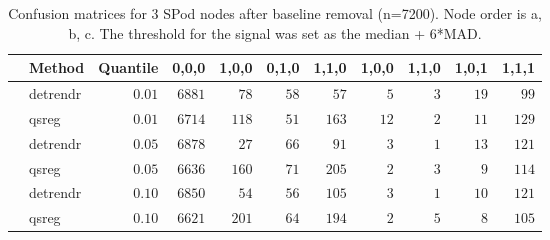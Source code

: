 \begin{table}[!tbp]
\caption{Confusion matrices for 3 SPod nodes after baseline 
      removal (n=7200). Node order is a, b, c. The threshold for the signal was 
      set as the median + 6*MAD.\label{confusion}} 
\begin{center}
\begin{tabular}{llrrrrrrrrr}
\hline\hline
\multicolumn{1}{l}{}&\multicolumn{1}{c}{Method}&\multicolumn{1}{c}{Quantile}&\multicolumn{1}{c}{0,0,0}&\multicolumn{1}{c}{1,0,0}&\multicolumn{1}{c}{0,1,0}&\multicolumn{1}{c}{1,1,0}&\multicolumn{1}{c}{1,0,0}&\multicolumn{1}{c}{1,1,0}&\multicolumn{1}{c}{1,0,1}&\multicolumn{1}{c}{1,1,1}\tabularnewline
\hline
&detrendr&$0.01$&$6881$&$ 78$&$58$&$ 57$&$ 5$&$3$&$19$&$ 99$\tabularnewline
&qsreg&$0.01$&$6714$&$118$&$51$&$163$&$12$&$2$&$11$&$129$\tabularnewline
&detrendr&$0.05$&$6878$&$ 27$&$66$&$ 91$&$ 3$&$1$&$13$&$121$\tabularnewline
&qsreg&$0.05$&$6636$&$160$&$71$&$205$&$ 2$&$3$&$ 9$&$114$\tabularnewline
&detrendr&$0.10$&$6850$&$ 54$&$56$&$105$&$ 3$&$1$&$10$&$121$\tabularnewline
&qsreg&$0.10$&$6621$&$201$&$64$&$194$&$ 2$&$5$&$ 8$&$105$\tabularnewline
\hline
\end{tabular}\end{center}
\end{table}
